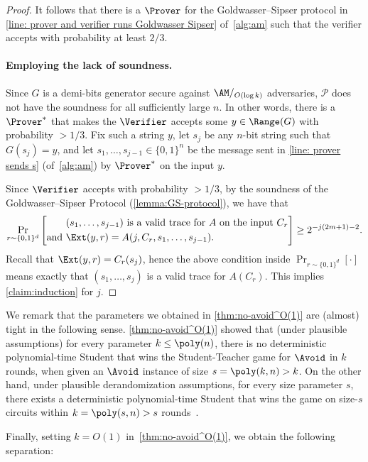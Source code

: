 \begin{proof}
It follows that there is a $\Prover$ for the Goldwasser--Sipser protocol in \autoref{line: prover and verifier runs Goldwasser Sipser} of~\autoref{alg:am} such that the verifier accepts with probability at least $2/3$.

\paragraph{Employing the lack of soundness.} Since $G$ is a demi-bits generator secure against $\AM/_{O(\log k)}$ adversaries, $\mathcal{P}$ does not have the soundness for all sufficiently large $n$. In other words, there is a $\Prover^*$ that makes the $\Verifier$ accepts some $y\in\Range(G)$ with probability $>1/3$. Fix such a string $y$, let $s_j$ be any $n$-bit string such that $G(s_j) = y$, and let $s_1, \dots, s_{j-1} \in \{0,1\}^n$ be the message sent in \autoref{line: prover sends s} (of~\autoref{alg:am}) by $\Prover^*$ on the input $y$.

Since $\Verifier$ accepts with probability $>1/3$, by the soundness of the Goldwasser--Sipser Protocol (\autoref{lemma:GS-protocol}), we have that
\[\Pr_{r\sim \{0,1\}^d}\left[\begin{aligned}
                &(s_1, \dots, s_{j-1})\text{ is a valid trace for $A$ on the input $C_r$}\\
                \text{and }&\Ext(y, r) = A(j, C_r, s_1, \dots, s_{j-1}).
            \end{aligned}\right] \ge 2^{-j(2m+1)-2}.\]
Recall that $\Ext(y, r) = C_r(s_j)$, hence the above condition inside $\Pr_{r\sim \{0,1\}^d}[\cdot]$ means exactly that $(s_1, \dots, s_j)$ is a valid trace for $A(C_r)$. This implies \autoref{claim:induction} for $j$.
\end{proof}


We remark that the parameters we obtained in \autoref{thm:no-avoid^O(1)} are (almost) tight in the following sense. \autoref{thm:no-avoid^O(1)} showed that (under plausible assumptions) for every parameter $k\le \poly(n)$, there is no deterministic polynomial-time Student that wins the Student-Teacher game for $\Avoid$ in $k$ rounds, when given an $\Avoid$ instance of size $s = \poly(k, n) > k$. On the other hand, under plausible derandomization assumptions, for every size parameter $s$, there exists a deterministic polynomial-time Student that wins the game on size-$s$ circuits within $k = \poly(s, n) > s$ rounds~\cite[Appendix A]{DBLP:conf/stoc/IlangoLW23}. 

Finally, setting $k=O(1)$ in~\autoref{thm:no-avoid^O(1)}, we obtain the following separation:

